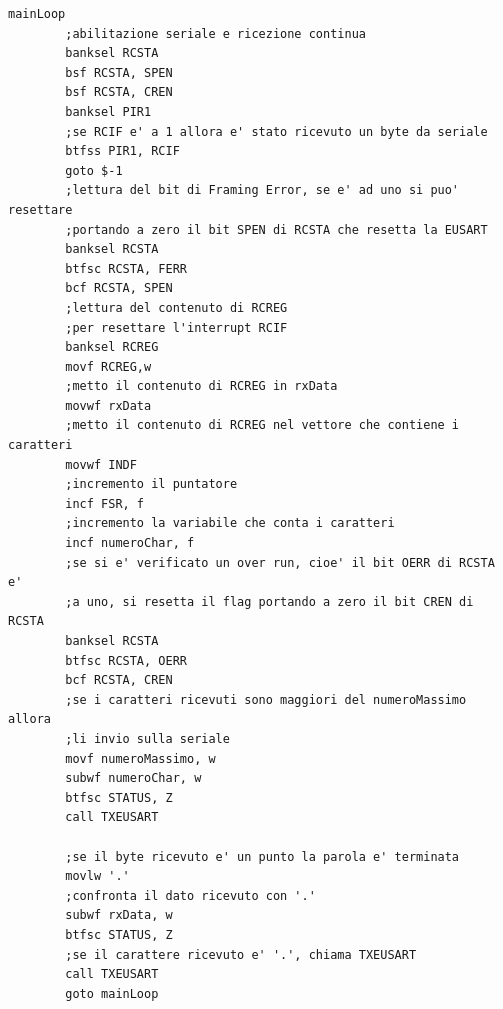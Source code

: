 \documentclass{article}
\begin{document}
	\begin{lstlisting}[frame=single]
	mainLoop	
		;abilitazione seriale e ricezione continua
		banksel RCSTA
		bsf RCSTA, SPEN
		bsf RCSTA, CREN
		banksel PIR1
		;se RCIF e' a 1 allora e' stato ricevuto un byte da seriale
		btfss PIR1, RCIF
		goto $-1
		;lettura del bit di Framing Error, se e' ad uno si puo' resettare
		;portando a zero il bit SPEN di RCSTA che resetta la EUSART
		banksel RCSTA
		btfsc RCSTA, FERR
		bcf RCSTA, SPEN
		;lettura del contenuto di RCREG
		;per resettare l'interrupt RCIF
		banksel RCREG
		movf RCREG,w
		;metto il contenuto di RCREG in rxData
		movwf rxData
		;metto il contenuto di RCREG nel vettore che contiene i caratteri
		movwf INDF
		;incremento il puntatore
		incf FSR, f
		;incremento la variabile che conta i caratteri
		incf numeroChar, f
		;se si e' verificato un over run, cioe' il bit OERR di RCSTA e' 
		;a uno, si resetta il flag portando a zero il bit CREN di RCSTA
		banksel RCSTA
		btfsc RCSTA, OERR
		bcf RCSTA, CREN
		;se i caratteri ricevuti sono maggiori del numeroMassimo allora
		;li invio sulla seriale
		movf numeroMassimo, w
		subwf numeroChar, w
		btfsc STATUS, Z 
		call TXEUSART
		
		;se il byte ricevuto e' un punto la parola e' terminata
		movlw '.'
		;confronta il dato ricevuto con '.'
		subwf rxData, w
		btfsc STATUS, Z  
		;se il carattere ricevuto e' '.', chiama TXEUSART
		call TXEUSART
		goto mainLoop
	\end{lstlisting}
	
\end{document}
